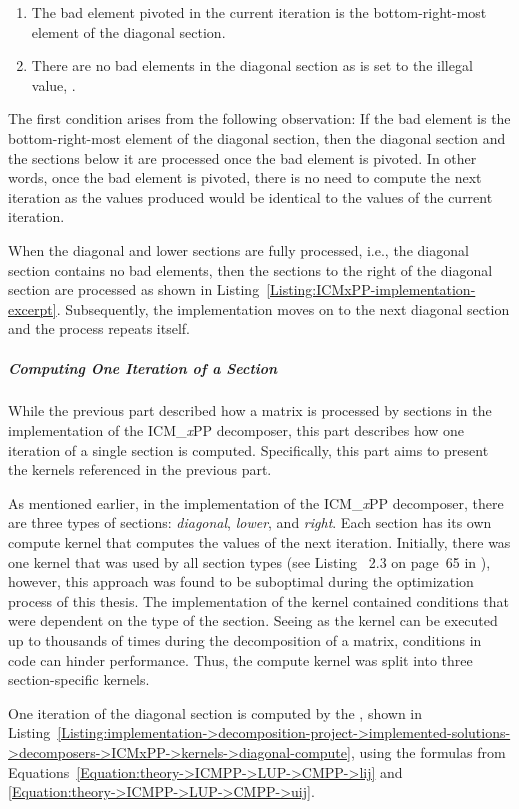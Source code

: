\begin{enumerate}
	\item The bad element pivoted in the current iteration is the bottom-right-most element of the diagonal section.
	\item There are no bad elements in the diagonal section as  is set to the illegal value, .
\end{enumerate}

The first condition arises from the following observation: If the bad element is the bottom-right-most element of the diagonal section, then the diagonal section and the sections below it are processed once the bad element is pivoted.
In other words, once the bad element is pivoted, there is no need to compute the next iteration as the values produced would be identical to the values of the current iteration.

When the diagonal and lower sections are fully processed, i.e., the diagonal section contains no bad elements, then the sections to the right of the diagonal section are processed as shown in Listing~\ref{Listing:ICMxPP-implementation-excerpt}.
Subsequently, the implementation moves on to the next diagonal section and the process repeats itself.

\subparagraph{Computing One Iteration of a Section} While the previous part described how a matrix is processed by sections in the implementation of the ICM\_\textit{x}PP decomposer, this part describes how one iteration of a single section is computed.
Specifically, this part aims to present the kernels referenced in the previous part.

As mentioned earlier, in the implementation of the ICM\_\textit{x}PP decomposer, there are three types of sections: \textit{diagonal}, \textit{lower}, and \textit{right}.
Each section has its own compute kernel that computes the values of the next iteration.
Initially, there was one kernel that was used by all section types (see Listing ~2.3 on page~65 in  \cite{Cejka2022}), however, this approach was found to be suboptimal during the optimization process of this thesis.
The implementation of the kernel contained conditions that were dependent on the type of the section.
Seeing as the kernel can be executed up to thousands of times during the decomposition of a matrix, conditions in code can hinder performance.
Thus, the compute kernel was split into three section-specific kernels.

One iteration of the diagonal section is computed by the , shown in Listing~\ref{Listing:implementation->decomposition-project->implemented-solutions->decomposers->ICMxPP->kernels->diagonal-compute}, using the formulas from Equations~\ref{Equation:theory->ICMPP->LUP->CMPP->lij} and \ref{Equation:theory->ICMPP->LUP->CMPP->uij}.

